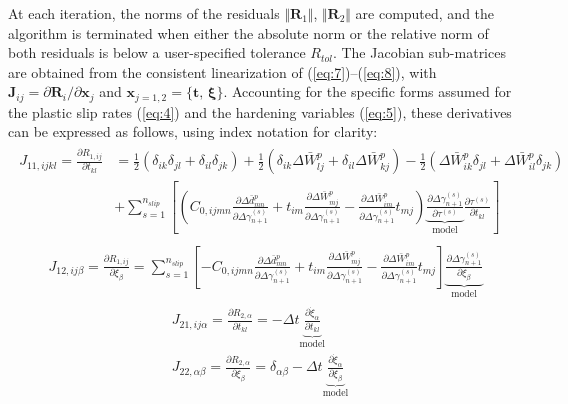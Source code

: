 \documentclass[review]{elsarticle}
\begin{document}
	At each iteration, the norms of the residuals $\Vert\mathbf{R}_1\Vert$, $\Vert\mathbf{R}_2\Vert$ are computed, and the algorithm is terminated when either the absolute norm or the relative norm of both residuals is below a user-specified tolerance $R_{tol}$.
	The Jacobian sub-matrices are obtained from the consistent linearization of (\ref{eq:7})--(\ref{eq:8}), with $\mathbf{J}_{ij} = \partial\mathbf{R}_i / \partial\mathbf{x}_j$ and $\mathbf{x}_{j=1,2} = \lbrace\mathbf{t} ,\, \bm{\xi}\rbrace$.
	Accounting for the specific forms assumed for the plastic slip rates (\ref{eq:4}) and the hardening variables (\ref{eq:5}), these derivatives can be expressed as follows, using index notation for clarity:
	\begin{gather}
	\begin{aligned}
	\label{eq:14}
	J_{11,ijkl} = \frac{\partial R_{1,ij}}{\partial t_{kl}} &= \frac{1}{2}\left( \delta_{ik}\delta_{jl}+\delta_{il}\delta_{jk} \right) + \frac{1}{2}\left( \delta_{ik}\Delta\bar{W}{_{lj}^p} + \delta_{il}\Delta\bar{W}{_{kj}^p} \right) 
	- \frac{1}{2}\left( \Delta\bar{W}{_{ik}^p}\delta_{jl} + \Delta\bar{W}{_{il}^p}\delta_{jk} \right) \\
	&+ \sum_{s=1}^{n_{slip}}\left[\left( C_{0,ijmn}\frac{\partial\Delta\bar{d}{_{mn}^p}}{\partial\Delta\gamma{_{n+1}^{(s)}}} + t_{im}\frac{\partial\Delta\bar{W}{_{mj}^p}}{\partial\Delta\gamma{_{n+1}^{(s)}}} - \frac{\partial\Delta\bar{W}{_{im}^p}}{\partial\Delta\gamma{_{n+1}^{(s)}}}t_{mj} \right) 
      \underbrace{\frac{\partial\Delta\gamma{_{n+1}^{(s)}}}{\partial\tau^{(s)}}}_{\text{model}} \frac{\partial\tau^{(s)}}{\partial t_{kl}} \right]
	\end{aligned}
	\end{gather}
	\begin{gather}
	\begin{aligned}
	&J_{12,ij\beta} = \frac{\partial R_{1,ij}}{\partial \xi_{\beta}} 
	= \sum_{s=1}^{n_{slip}}\left[ -C_{0,ijmn}\frac{\partial\Delta\bar{d}{_{mn}^p}}{\partial\Delta\gamma{_{n+1}^{(s)}}}
      + t_{im}\frac{\partial\Delta\bar{W}{_{mj}^p}}{\partial\Delta\gamma{_{n+1}^{(s)}}} - \frac{\partial\Delta\bar{W}{_{im}^p}}{\partial\Delta\gamma{_{n+1}^{(s)}}}t_{mj} \right]
      \underbrace{\frac{\partial\Delta\gamma{_{n+1}^{(s)}}}{\partial\xi_{\beta}}}_{\text{model}}
	\end{aligned}
	\end{gather}
	\begin{gather}
	J_{21,ij\alpha} = \frac{\partial R_{2,\alpha}}{\partial t_{kl}} = -\Delta t\underbrace{\frac{\partial\dot{\xi}_\alpha}{\partial t_{kl}}}_{\text{model}}
	\\
	\label{eq:17}
	J_{22,\alpha\beta} = \frac{\partial R_{2,\alpha}}{\partial \xi_{\beta}} = \delta_{\alpha \beta} - \Delta t \underbrace{\frac{\partial\dot{\xi}_\alpha}{\partial \xi_{\beta}}}_{\text{model}}
	\end{gather}
	
\end{document}
